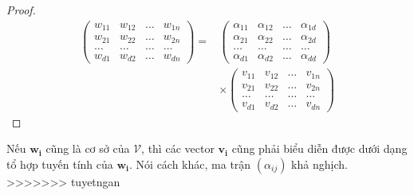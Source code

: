 \begin{proof}
    \begin{align*}
        \begin{pmatrix}
            w_{11} & w_{12} & \ldots & w_{1n} \\
            w_{21} & w_{22} & \ldots & w_{2n} \\
            \ldots & \ldots & \ldots & \ldots \\
            w_{d1} & w_{d2} & \ldots & w_{dn}
        \end{pmatrix}
        = & \begin{pmatrix}
            \alpha_{11} & \alpha_{12} & \ldots & \alpha_{1d} \\
            \alpha_{21} & \alpha_{22} & \ldots & \alpha_{2d} \\
            \ldots & \ldots & \ldots & \ldots \\
            \alpha_{d1} & \alpha_{d2} & \ldots & \alpha_{dd}
        \end{pmatrix} \\
        & \times \begin{pmatrix}
            v_{11} & v_{12} & \ldots & v_{1n} \\ 
            v_{21} & v_{22} & \ldots & v_{2n} \\ 
            \ldots & \ldots & \ldots & \ldots \\ 
            v_{d1} & v_{d2} & \ldots & v_{dn}
        \end{pmatrix}
    \end{align*}
\end{proof}

Nếu $\bm{w_i}$ cũng là cơ sở của $\mathcal{V}$, thì các vector $\bm{v_i}$ cũng phải
biểu diễn được dưới dạng tổ hợp tuyến tính của $\bm{w_i}$.
Nói cách khác, ma trận $(\alpha_{ij})$ khả nghịch.
>>>>>>> tuyetngan
